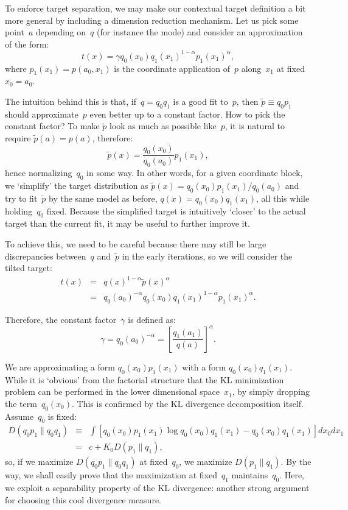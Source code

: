 \documentclass{article}
\begin{document}
To enforce target separation, we may make our contextual target definition a bit more general by including a dimension reduction mechanism. Let us pick some point~$a$ depending on~$q$ (for instance the mode) and consider an approximation of the form:
$$
t(x) = \gamma q_0(x_0) q_1(x_1)^{1-\alpha}p_1(x_1)^\alpha,
$$
where $p_1(x_1)=p(a_0, x_1)$ is the coordinate application of~$p$ along~$x_1$ at fixed $x_0=a_0$. 

The intuition behind this is that, if~$q=q_0q_1$ is a good fit to~$p$, then $\tilde{p}\equiv q_0p_1$ should approximate~$p$ even better up to a constant factor. How to pick the constant factor? To make $\tilde{p}$ look as much as possible like~$p$, it is natural to require $\tilde{p}(a)=p(a)$, therefore:
$$
\tilde{p}(x) = \frac{q_0(x_0)}{q_0(a_0)} p_1(x_1),
$$
hence normalizing~$q_0$ in some way. In other words, for a given coordinate block, we `simplify' the target distribution as $\tilde{p}(x)=q_0(x_0)p_1(x_1)/q_0(a_0)$ and try to fit~$\tilde{p}$ by the same model as before, $q(x)=q_0(x_0)q_1(x_1)$, all this while holding~$q_0$ fixed. Because the simplified target is intuitively `closer' to the actual target than the current fit, it may be useful to further improve it.

To achieve this, we need to be careful because there may still be large discrepancies between~$q$ and~$\tilde{p}$ in the early iterations, so we will consider the tilted target:
\begin{eqnarray*}
t(x) 
 & = & q(x)^{1-\alpha} \tilde{p}(x)^\alpha \\
 & = & q_0(a_0)^{-\alpha} q_0(x_0) q_1(x_1)^{1-\alpha} p_1(x_1)^\alpha . 
\end{eqnarray*}

Therefore, the constant factor~$\gamma$ is defined as: 
$$
\gamma = q_0(a_0)^{-\alpha}
= \left[\frac{q_1(a_1)}{q(a)}\right]^{\alpha}.
$$

We are approximating a form $q_0(x_0)p_1(x_1)$ with a form $q_0(x_0)q_1(x_1)$. While it is `obvious' from the factorial structure that the KL minimization problem can be performed in the lower dimensional space~$x_1$, by simply dropping the term~$q_0(x_0)$. This is confirmed by the KL divergence decomposition itself. Assume~$q_0$ is fixed:
\begin{eqnarray*}
D(q_0 p_1 \| q_0 q_1) 
 & \equiv & 
 \int \left[
 q_0(x_0)p_1(x_1) 
 \log q_0(x_0)q_1(x_1) - q_0(x_0)q_1(x_1)
 \right]
 dx_0 dx_1 \\
& = & 
 c + K_0 D(p_1\|q_1),
\end{eqnarray*}
so, if we maximize $D(q_0p_1\|q_0q_1)$ at fixed~$q_0$, we maximize $D(p_1\|q_1)$. By the way, we shall easily prove that the maximization at fixed~$q_1$ maintains~$q_0$. Here, we exploit a separability property of the KL divergence: another strong argument for choosing this cool divergence measure. 
\end{document}
